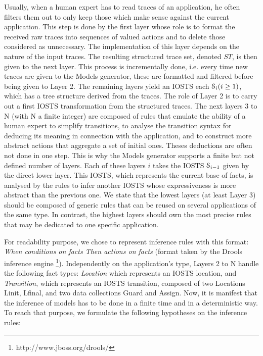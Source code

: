 Usually, when a human expert has to read traces of an
application, he often filters them out to only keep those which
make sense against the current application. This step is done by
the first layer whose role is to format the received raw traces
into sequences of valued actions and to delete those considered
as unnecessary. The implementation of this layer depends on the
nature of the input traces. The resulting structured trace set,
denoted $ST$, is then given to the next layer. This process is
incrementally done, i.e. every time new traces are given to the
Models generator, these are formatted and filtered before being
given to Layer 2. The remaining layers yield an IOSTS each
$\EuScript{S}_i (i\geq 1)$, which has a tree structure derived
from the traces. The role of Layer 2 is to carry out a first
IOSTS transformation from the structured traces. The next layers
3 to N (with N a finite integer) are composed of rules that
emulate the ability of a human expert to simplify transitions, to
analyse the transition syntax for deducing its meaning in
connection with the application, and to construct more abstract
actions that aggregate a set of initial ones. Theses deductions
are often not done in one step. This is why the Models generator
supports a finite but not defined number of layers.  Each of
these layers $i$ takes the IOSTS $\EuScript{S}_{i-1}$ given by
the direct lower layer. This IOSTS, which represents the current
base of facts, is analysed by the rules to infer another IOSTS
whose expressiveness is more abstract than the previous one. We
state that the lowest layers (at least Layer 3) should be
composed of generic rules that can be reused on several
applications of the same type. In contrast, the highest layers
should own the most precise rules that may be dedicated to one
specific application.

For readability purpose, we chose to represent inference rules
with this format: \emph{When conditions on facts Then actions on
facts} (format taken by the Drools inference engine
\footnote{http://www.jboss.org/drools/}). Independently on the
application's type, Layers 2 to N handle the following fact
types: \emph{Location} which represents an IOSTS location, and
\emph{Transition}, which represents an IOSTS transition, composed
of two Locations Linit, Lfinal, and two data collections Guard
and Assign. Now, it is manifest that the inference of models has
to be done in a finite time and in a deterministic way. To reach
that purpose, we formulate the following hypotheses on the
inference rules:

